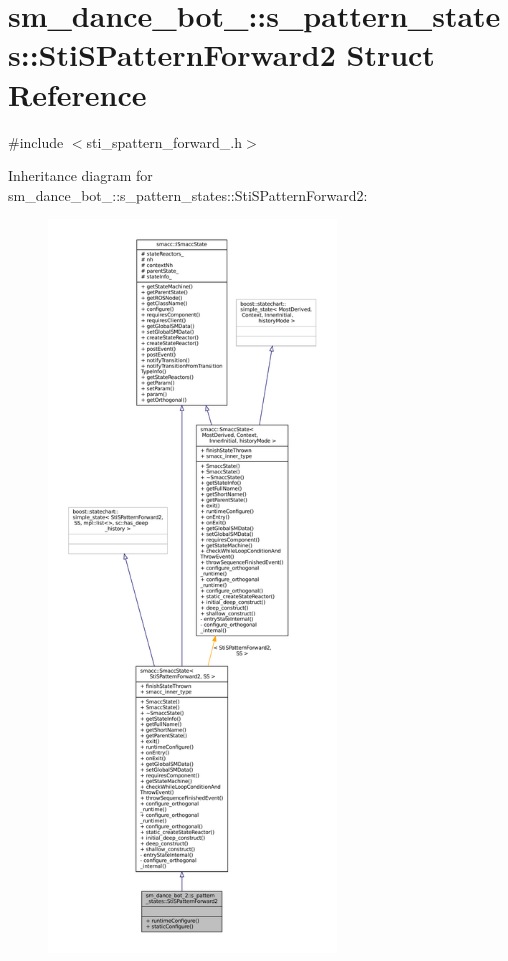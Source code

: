 \hypertarget{structsm__dance__bot__2_1_1s__pattern__states_1_1StiSPatternForward2}{}\section{sm\+\_\+dance\+\_\+bot\+\_\+:\+:s\+\_\+pattern\+\_\+states\+:\+:Sti\+S\+Pattern\+Forward2 Struct Reference}
\label{structsm__dance__bot__2_1_1s__pattern__states_1_1StiSPatternForward2}


{\ttfamily \#include $<$sti\+\_\+spattern\+\_\+forward\+\_.\+h$>$}



Inheritance diagram for sm\+\_\+dance\+\_\+bot\+\_\+:\+:s\+\_\+pattern\+\_\+states\+:\+:Sti\+S\+Pattern\+Forward2\+:
\nopagebreak
\begin{figure}[H]
\begin{center}
\leavevmode
\includegraphics[height=550pt]{structsm__dance__bot__2_1_1s__pattern__states_1_1StiSPatternForward2__inherit__graph}
\end{center}
\end{figure}



